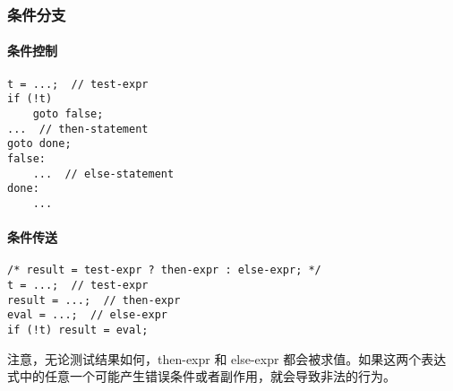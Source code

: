 \subsubsection{条件分支}
\paragraph{条件控制}
\begin{lstlisting}[style=CStyle]
t = ...;  // test-expr
if (!t)
    goto false;
...  // then-statement
goto done;
false:
    ...  // else-statement
done:
    ...
\end{lstlisting}
\paragraph{条件传送}
\begin{lstlisting}[style=CStyle]
/* result = test-expr ? then-expr : else-expr; */
t = ...;  // test-expr
result = ...;  // then-expr
eval = ...;  // else-expr
if (!t) result = eval;
\end{lstlisting}

注意，无论测试结果如何，then-expr 和 else-expr 都会被求值。如果这两个表达式中的任意一个可能产生错误条件或者副作用，就会导致非法的行为。

